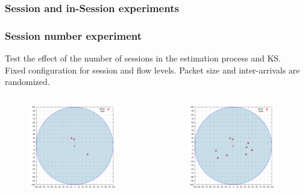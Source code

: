 \documentclass[9pt,handout,serif]{beamer}
\begin{document}
\subsubsection*{Session and in-Session experiments}
\begin{frame}[c]
	\frametitle{Session number experiment}
	Test the effect of the number of sessions in the estimation process and KS. \\
	Fixed configuration for session and flow levels. Packet size and inter-arrivals are randomized.
	\begin{columns}
		\centering
		\begin{figure}
			\centering
			\includegraphics[width=0.9\textwidth]{../images/results/GlobalView/sessions/3sessions}
		\end{figure}
		\begin{figure}
			\centering
			\includegraphics[width=0.9\textwidth]{../images/results/GlobalView/sessions/9sessions}

\end{figure}
\end{columns}
\end{frame}
\end{document}
